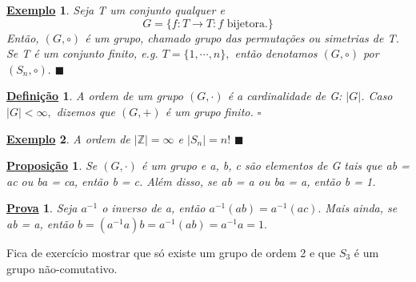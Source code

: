 \documentclass{article}
\newtheorem*{def*}{\underline{Defini\c c\~ao}}
\newtheorem*{prop*}{\underline{Proposi\c c\~ao}}
\newtheorem{example*}{\underline{Exemplo}}
\newtheorem*{proof*}{\underline{Prova}}
\renewcommand\qedsymbol{$\blacksquare$}
\begin{document}
\begin{example*}
  Seja T um conjunto qualquer e 
  $$
    G = \{f:T\rightarrow T: f \text{ bijetora.}\}
  $$
  Ent\~ao, $(G, \circ)$ \'e um grupo, chamado grupo das permuta\c c\~oes ou simetrias de T. Se T \'e um conjunto finito, e.g.
  $T = \{1, \cdots, n\}, $ ent\~ao denotamos $(G, \circ)$ por $(S_{n}, \circ).$ \qedsymbol
\end{example*}
\begin{def*}
  A ordem de um grupo $(G, \cdot)$ \'e a cardinalidade de G: $|G|$. Caso $|G| < \infty,$ dizemos que $(G, +)$ \'e um grupo finito. $\square$
\end{def*}
\begin{example*}
  A ordem de $|\mathbb{Z}| = \infty$ e $|S_{n}| = n!$ \qedsymbol
\end{example*}
\begin{prop*}
  Se $(G, \cdot)$ \'e um grupo e a, b, c s\~ao elementos de G tais que ab = ac ou ba = ca, ent\~ao b = c. Al\'em disso, se ab = a ou
ba = a, ent\~ao b = 1.
\end{prop*}
\begin{proof*}
  Seja $a^{-1}$ o inverso de a, ent\~ao $a^{-1}(ab) = a^{-1}(ac).$ Mais ainda, se ab = a, ent\~ao $b = (a^{-1}a)b = a^{-1}(ab) = a^{-1}a = 1.$
\end{proof*}
  Fica de exerc\'icio mostrar que s\'o existe um grupo de ordem 2 e que $S_{3}$ \'e um grupo n\~ao-comutativo.
\end{document}
